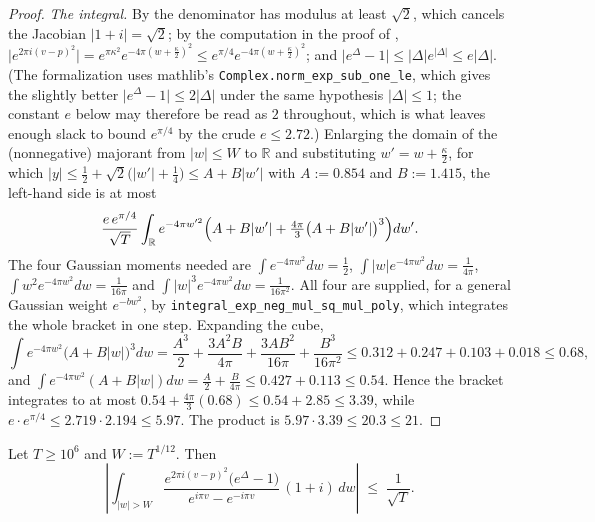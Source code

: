 \begin{proof}
\emph{The integral.}  By  the denominator has modulus at least $\sqrt2$,
which cancels the Jacobian $\lvert1+i\rvert=\sqrt2$; by the computation in the proof of
,
$\lvert e^{2\pi i(v-p)^{2}}\rvert=e^{\pi\kappa^{2}}e^{-4\pi\left(w+\frac\kappa2\right)^{2}}\le
e^{\pi/4}e^{-4\pi\left(w+\frac\kappa2\right)^{2}}$; and
$\lvert e^{\Delta}-1\rvert\le\lvert\Delta\rvert e^{\lvert\Delta\rvert}\le e\lvert\Delta\rvert$.
(The formalization uses mathlib's \texttt{Complex.norm\_exp\_sub\_one\_le}, which gives the
slightly better $\lvert e^{\Delta}-1\rvert\le2\lvert\Delta\rvert$ under the same hypothesis
$\lvert\Delta\rvert\le1$; the constant $e$ below may therefore be read as $2$ throughout, which is
what leaves enough slack to bound $e^{\pi/4}$ by the crude $e\le2.72$.)
Enlarging the domain of the (nonnegative) majorant from $\lvert w\rvert\le W$ to $\mathbb{R}$ and
substituting $w'=w+\tfrac\kappa2$, for which
$\lvert y\rvert\le\tfrac12+\sqrt2\bigl(\lvert w'\rvert+\tfrac14\bigr)\le A+B\lvert w'\rvert$ with
$A:=0.854$ and $B:=1.415$, the left-hand side is at most
\[
  \frac{e\,e^{\pi/4}}{\sqrt T}\int_{\mathbb{R}}e^{-4\pi w'^{2}}
    \Bigl(A+B\lvert w'\rvert+\tfrac{4\pi}{3}\bigl(A+B\lvert w'\rvert\bigr)^{3}\Bigr)dw' .
\]
The four Gaussian moments needed are
$\int e^{-4\pi w^{2}}dw=\tfrac12$, $\int\lvert w\rvert e^{-4\pi w^{2}}dw=\tfrac1{4\pi}$,
$\int w^{2}e^{-4\pi w^{2}}dw=\tfrac1{16\pi}$ and
$\int\lvert w\rvert^{3}e^{-4\pi w^{2}}dw=\tfrac1{16\pi^{2}}$.  All four are supplied, for a general
Gaussian weight $e^{-bw^{2}}$, by \texttt{integral\_exp\_neg\_mul\_sq\_mul\_poly}, which
integrates the whole bracket in one step.  Expanding the cube,
\[
  \int e^{-4\pi w^{2}}\bigl(A+B\lvert w\rvert\bigr)^{3}dw
  =\frac{A^{3}}2+\frac{3A^{2}B}{4\pi}+\frac{3AB^{2}}{16\pi}+\frac{B^{3}}{16\pi^{2}}
  \le0.312+0.247+0.103+0.018\le0.68,
\]
and $\int e^{-4\pi w^{2}}(A+B\lvert w\rvert)dw=\tfrac A2+\tfrac{B}{4\pi}\le0.427+0.113\le0.54$.
Hence the bracket integrates to at most $0.54+\tfrac{4\pi}{3}(0.68)\le0.54+2.85\le3.39$, while
$e\cdot e^{\pi/4}\le2.719\cdot2.194\le5.97$.  The product is $5.97\cdot3.39\le20.3\le21$.
\end{proof}

\begin{lemma}
\label{lem:rsf_outer}
\leanok
{}
Let $T\ge10^{6}$ and $W:=T^{1/12}$.  Then
\[
  \left\lvert\int_{\lvert w\rvert>W}
    \frac{e^{2\pi i(v-p)^{2}}\bigl(e^{\Delta}-1\bigr)}{e^{i\pi v}-e^{-i\pi v}}\,(1+i)\,dw
  \right\rvert\;\le\;\frac{1}{\sqrt T} .
\]
\end{lemma}


